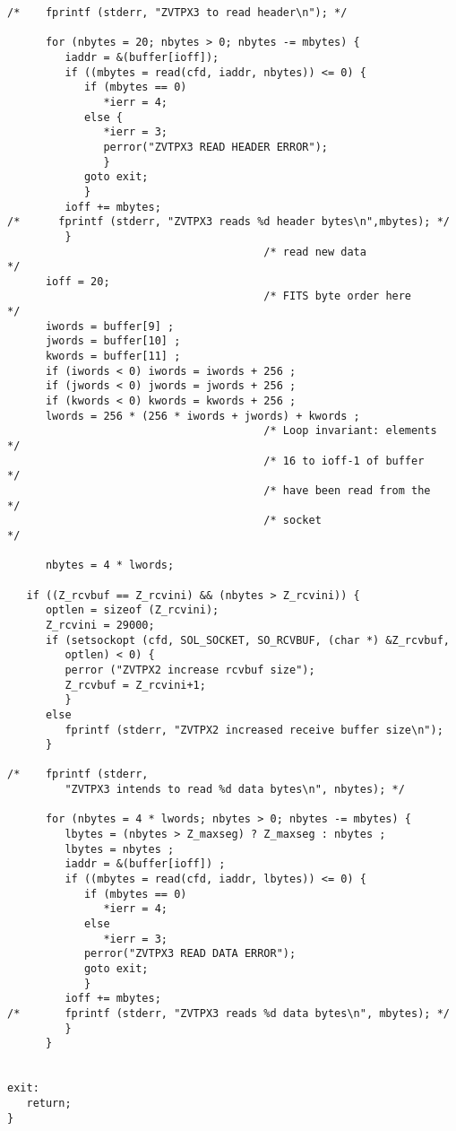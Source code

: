 \begin{center}
\begin{verbatim}
/*    fprintf (stderr, "ZVTPX3 to read header\n"); */

      for (nbytes = 20; nbytes > 0; nbytes -= mbytes) {
         iaddr = &(buffer[ioff]);
         if ((mbytes = read(cfd, iaddr, nbytes)) <= 0) {
            if (mbytes == 0)
               *ierr = 4;
            else {
               *ierr = 3;
               perror("ZVTPX3 READ HEADER ERROR");
               }
            goto exit;
            }
         ioff += mbytes;
/*      fprintf (stderr, "ZVTPX3 reads %d header bytes\n",mbytes); */
         }
                                        /* read new data              */
      ioff = 20;
                                        /* FITS byte order here       */
      iwords = buffer[9] ;
      jwords = buffer[10] ;
      kwords = buffer[11] ;
      if (iwords < 0) iwords = iwords + 256 ;
      if (jwords < 0) jwords = jwords + 256 ;
      if (kwords < 0) kwords = kwords + 256 ;
      lwords = 256 * (256 * iwords + jwords) + kwords ;
                                        /* Loop invariant: elements  */
                                        /* 16 to ioff-1 of buffer    */
                                        /* have been read from the   */
                                        /* socket                    */

      nbytes = 4 * lwords;

   if ((Z_rcvbuf == Z_rcvini) && (nbytes > Z_rcvini)) {
      optlen = sizeof (Z_rcvini);
      Z_rcvini = 29000;
      if (setsockopt (cfd, SOL_SOCKET, SO_RCVBUF, (char *) &Z_rcvbuf,
         optlen) < 0) {
         perror ("ZVTPX2 increase rcvbuf size");
         Z_rcvbuf = Z_rcvini+1;
         }
      else
         fprintf (stderr, "ZVTPX2 increased receive buffer size\n");
      }

/*    fprintf (stderr,
         "ZVTPX3 intends to read %d data bytes\n", nbytes); */

      for (nbytes = 4 * lwords; nbytes > 0; nbytes -= mbytes) {
         lbytes = (nbytes > Z_maxseg) ? Z_maxseg : nbytes ;
         lbytes = nbytes ;
         iaddr = &(buffer[ioff]) ;
         if ((mbytes = read(cfd, iaddr, lbytes)) <= 0) {
            if (mbytes == 0)
               *ierr = 4;
            else
               *ierr = 3;
            perror("ZVTPX3 READ DATA ERROR");
            goto exit;
            }
         ioff += mbytes;
/*       fprintf (stderr, "ZVTPX3 reads %d data bytes\n", mbytes); */
         }
      }


exit:
   return;
}

\end{verbatim}
\end{center}

